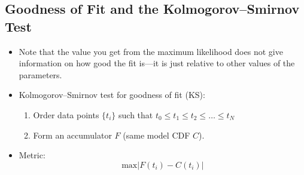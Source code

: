 \subsection{Goodness of Fit and the Kolmogorov–Smirnov Test}

\begin{itemize}
      \item Note that the value you get from the maximum likelihood does not give information on how good the fit is—it is just relative to other values of the parameters.
      \item Kolmogorov–Smirnov test for goodness of fit (KS):
            \begin{enumerate}
                  \item Order data points $\{t_i\}$ such that $t_0 \leq t_1 \leq t_2 \leq \ldots \leq t_N$
                  \item Form an accumulator $F$ (same model CDF $C$).
            \end{enumerate}
      \item Metric:
            \[ \text{max}|F(t_i) - C(t_i)| \]
\end{itemize}
